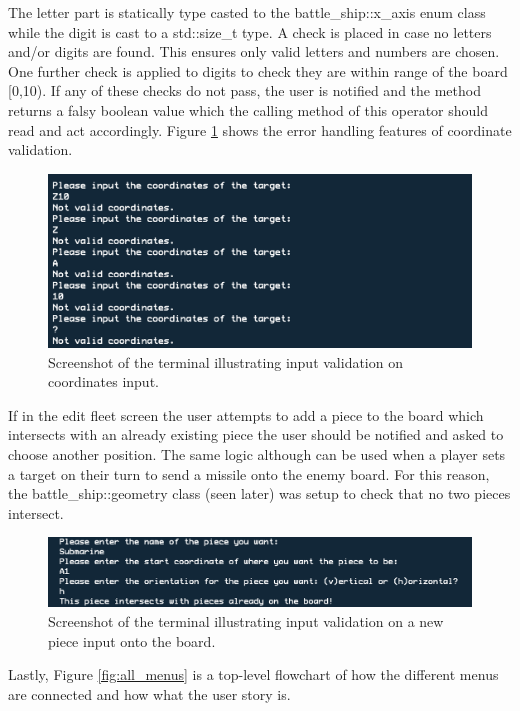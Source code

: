 \documentclass[11pt]{article} %
\begin{document}
The letter part is statically type casted to the battle\_ship::x\_axis enum class while the digit
is cast to a std::size\_t type.
A check is placed in case no letters and/or digits are found.
This ensures only valid letters and numbers are chosen.
One further check is applied to digits to check they are within range of the board [0,10).
If any of these checks do not pass, the user is notified and the method returns a falsy boolean
value which the calling method of this operator should read and act accordingly.
Figure \ref{fig:coordinate_validation} shows the error handling features of coordinate validation.
\begin{figure}[H]
\centering
\includegraphics[scale=0.6]{images/coordinate_validation.png}
\caption{Screenshot of the terminal illustrating input validation on coordinates input.}
\label{fig:coordinate_validation}
\end{figure}
If in the edit fleet screen the user attempts to add a piece to the board which intersects with an already existing piece
the user should be notified and asked to choose another position.
The same logic although can be used when a player sets a target on their turn to send a missile
onto the enemy board.
For this reason, the battle\_ship::geometry class (seen later) was setup to check that no two pieces intersect.
\begin{figure}[H]
\centering
\includegraphics[scale=0.6]{images/board_validation.png}
\caption{Screenshot of the terminal illustrating input validation on a new piece input onto the board.}
\label{fig:board_validation}
\end{figure}
Lastly, Figure \ref{fig:all_menus} is a top-level flowchart of how the different menus are connected and
how what the user story is.
\end{document}
